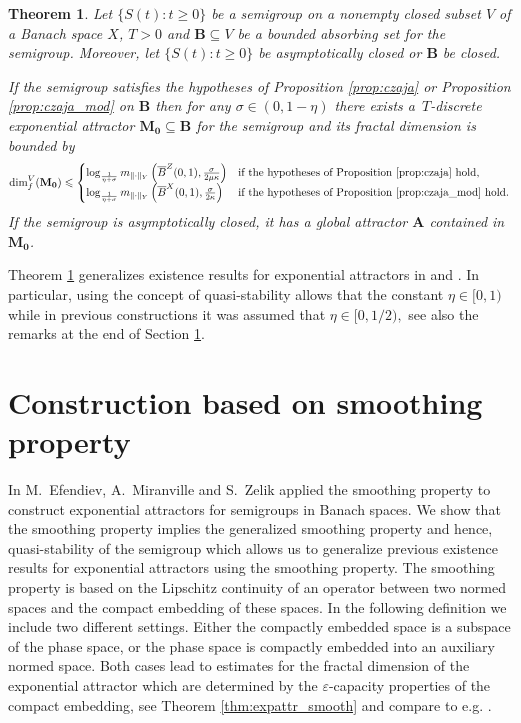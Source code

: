 \documentclass[a4paper,12pt,reqno]{amsart}
\theoremstyle{plain}
\newtheorem{thm}[lem]{Theorem}
\theoremstyle{definition}
\numberwithin{equation}{section}
\newcommand{\eps}{\varepsilon}
\newcommand{\dimf}{\operatorname{dim}_{f}}
\renewcommand{\geq}{\geqslant}
\renewcommand{\leq}{\leqslant}
\begin{document}
\begin{thm}\label{thm:expattr_CE}
Let $\{S(t)\colon t\geq 0\}$ be a semigroup on a nonempty closed subset $V$ of a Banach space $X$, $T>0$  and $\mathbf{B}\subseteq V$ be a bounded absorbing set for the semigroup. Moreover, let $\{S(t)\colon t\geq 0\}$ be asymptotically closed or $\mathbf{B}$ be closed. 

If the semigroup satisfies the hypotheses of Proposition \ref{prop:czaja} or Proposition \ref{prop:czaja_mod} on $\mathbf{B}$  then for any $\sigma\in(0,1-\eta)$ there exists a~$T$-discrete exponential attractor  $\mathbf{M_0}\subseteq \mathbf{B}$ for the semigroup and its fractal dimension is bounded by 
\begin{equation*}
\dimf^{V}(\mathbf{M_0})\leq 
\begin{cases}
\log_{\frac{1}{\eta+\sigma}}m_{\|\cdot\|_Y}\left(\overline{B}^Z(0,1),\frac{\sigma}{2\mu\kappa}\right)& \text{if the hypotheses of Proposition \ref{prop:czaja} hold},\\
\log_{\frac{1}{\eta+\sigma}}m_{\|\cdot\|_Y}\left(\overline{B}^X(0,1),\frac{\sigma}{2\kappa}\right)& \text{if the hypotheses of Proposition \ref{prop:czaja_mod} hold}.
\end{cases}
\end{equation*}
If the semigroup is asymptotically closed, it has a global attractor $\mathbf{A}$  contained in $\mathbf{M_0}$.
\end{thm}

Theorem \ref{thm:expattr_CE} generalizes existence results for exponential attractors in \cite{CzEf} and 
\cite{CaSo}. In particular, using the concept of quasi-stability allows that the constant $\eta\in[0,1)$ while in previous constructions it was assumed that $\eta\in[0,1/2),$ see also the remarks at the end of Section \ref{sec:SP}.

\section{Construction based on smoothing property}\label{sec:SP}

In \cite{EfMiZe} M.~Efendiev, A.~Miranville and S.~Zelik applied the smoothing property to construct exponential attractors for semigroups in Banach spaces. We show that the smoothing property implies the generalized smoothing property and hence, quasi-stability of the semigroup which allows us to generalize previous existence results for exponential attractors using the smoothing property. 
The smoothing property is based on the Lipschitz continuity of an operator between two normed spaces and the compact embedding of these spaces. In the following definition we include two different settings.  
Either the compactly embedded space is a subspace of the phase space, or the phase space is compactly embedded into an auxiliary normed space. Both cases lead to estimates for the fractal dimension of the exponential attractor which are determined by the $\eps$-capacity properties of the compact embedding, see Theorem \ref{thm:expattr_smooth} and compare to e.g. \cite{EfMiZe,CCM,CaSo,sonner2012}.   
\end{document}
